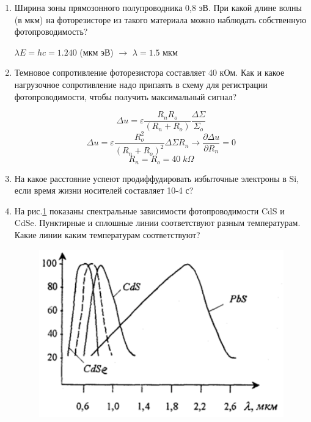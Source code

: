 \documentclass[a4paper]{article}
\begin{document}
\begin{enumerate}
    \item Ширина зоны прямозонного полупроводника 0,8 эВ. При какой длине волны (в мкм) на фоторезисторе из такого материала можно наблюдать собственную  фотопроводимость? \par 
    $\lambda E = hc = 1.240$ (мкм эВ) $\longrightarrow$ $\lambda = 1.5$ мкм

    \item Темновое сопротивление фоторезистора составляет 40 кОм. Как и какое нагрузочное сопротивление надо припаять в схему для регистрации фотопроводимости, чтобы получить максимальный сигнал? \par 
    $$\Delta u = \varepsilon \frac{R_n R_o}{(R_n + R_o)} \frac{\Delta \Sigma}{\Sigma_o}$$
    $$\Delta u = \varepsilon \frac{R_o^2}{(R_n + R_o)^2} \Delta \Sigma R_n \rightarrow \frac{\partial \Delta u}{\partial R_n} = 0$$
    $$R_n = R_o = 40\; k\Omega$$

    \item На какое расстояние успеют продиффудировать избыточные электроны в Si, если время жизни носителей составляет 10-4 с? \par 
    

    \item На рис.\ref{9} показаны спектральные зависимости фотопроводимости CdS  и CdSe. Пунктирные и сплошные линии соответствуют разным температурам. Какие линии  каким температурам соответствуют? \par 
    \begin{figure}[H]
        \centering
        \includegraphics[scale = 0.6]{9.png}
        \caption{}
        \label{9}
    \end{figure} 


\end{enumerate}
\end{document}
